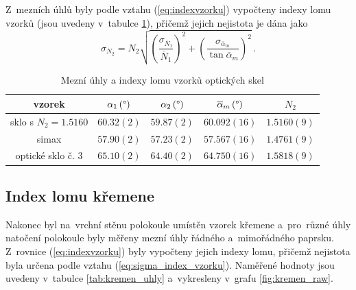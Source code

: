 \documentclass{../concepts/titul_protokol_p/prepareprotokol} %
\newcommand{\relative}[1]{
\frac{\sigma_{#1}}{#1}
}
\newcommand{\squared}[1]{
\left( #1 \right)^2
}
\newcommand{\relsqr}[1]{
\squared{\relative{#1}}
}
\begin{document}
Z~mezních úhlů byly podle vztahu (\ref{eq:indexvzorku}) vypočteny indexy lomu vzorků (jsou uvedeny 
v~tabulce \ref{tab:vzorky}), přičemž jejich nejistota je dána jako \cite{englich}
\begin{equation}
    \label{eq:sigma_index_vzorku}
    \sigma_{N_2} = N_2 \sqrt{ \relsqr{\overline{N}_1} + \left(\frac{\sigma_{\overline{\alpha}_m}} 
    {\tan \overline{\alpha}_m}\right)^2 } \,.
\end{equation}

\begin{table}[!htbp]
\centering
\caption{Mezní úhly a indexy lomu vzorků optických skel}
\begin{tabular}{ccccc}
 \toprule
 vzorek & $\alpha_1\, (\degree)$ & $\alpha_2\, (\degree)$ & $\overline{\alpha}_m\, (\degree)$ & $N_2$\\
 \midrule
 sklo s $N_2=1.5160$ & $60.32(2)$ & $59.87(2)$ & $60.092(16)$ & $1.5160(9)$ \\
 simax & $57.90(2)$ & $57.23(2)$ & $57.567(16)$ & $1.4761(9)$ \\
 optické sklo č. 3 & $65.10(2)$ & $64.40(2)$ & $64.750(16)$ & $1.5818(9)$ \\
 \bottomrule
\end{tabular}
\label{tab:vzorky}
\end{table}


\subsection{Index lomu křemene}

Nakonec byl na~vrchní stěnu polokoule umístěn vzorek křemene a~pro~různé úhly natočení polokoule
byly měřeny mezní úhly řádného a~mimořádného paprsku. Z~rovnice (\ref{eq:indexvzorku}) byly vypočteny
jejich indexy lomu, přičemž nejistota byla určena podle vztahu (\ref{eq:sigma_index_vzorku}). 
Naměřené hodnoty jsou uvedeny v~tabulce \ref{tab:kremen_uhly} a~vykresleny v~grafu \ref{fig:kremen_raw}.
\end{document}
